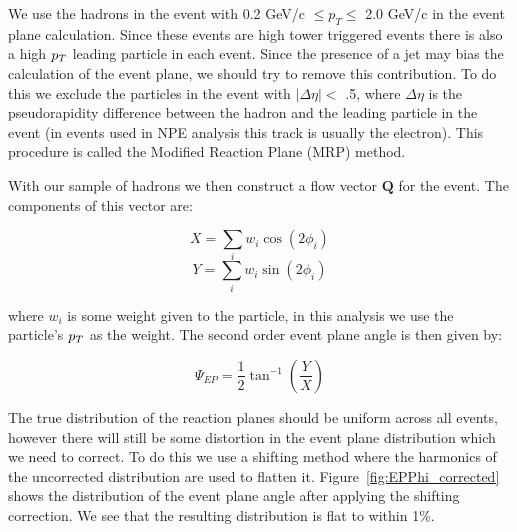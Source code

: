 We use the hadrons in the event with 0.2 GeV/c $ \leq p_{T} \leq $ 2.0 GeV/c in the event plane calculation. Since these events are high tower triggered events there is also a high $p_{T}$ leading particle in each event. Since the presence of a jet may bias the calculation of the event plane, we should try to remove this contribution. To do this we exclude the particles in the event with $|\Delta\eta| <$ .5, where $\Delta\eta$ is the pseudorapidity difference between the hadron and the leading particle in the event (in events used in NPE analysis this track is usually the electron). This procedure is called the Modified Reaction Plane (MRP) method.

With our sample of hadrons we then construct a flow vector $\mathbf{Q}$ for the event. The components of this vector are:

\begin{equation}\label{eq:Xcomp}
X = \sum_{i} w_i \cos(2\phi_i)
\end{equation}
\begin{equation}\label{eq:Ycomp}
Y = \sum_{i} w_i \sin(2\phi_i)
\end{equation}

where $w_i$ is some weight given to the particle, in this analysis we use the particle's $p_{T}$ as the weight. The second order event plane angle is then given by:

\begin{equation}\label{eq:EP}
\Psi_{EP} = \frac{1}{2}\tan^{-1}(\frac{Y}{X})
\end{equation}

The true distribution of the reaction planes should be uniform across all events, however there will still be some distortion in the event plane distribution which we need to correct. To do this we use a shifting method where the harmonics of the uncorrected distribution are used to flatten it. Figure~\ref{fig:EPPhi_corrected} shows the distribution of the event plane angle after applying the shifting correction. We see that the resulting distribution is flat to within 1\%.

